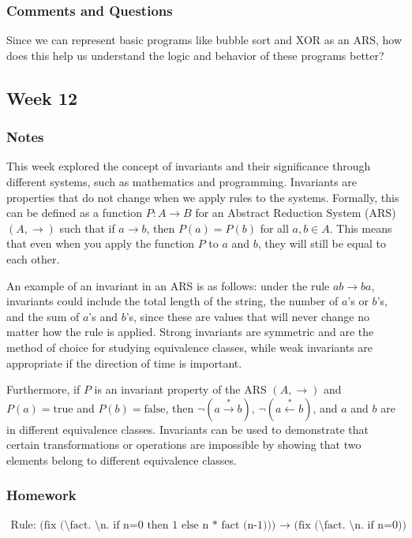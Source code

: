 \documentclass{article}
\theoremstyle{theorem}
\theoremstyle{definition}
\theoremstyle{remark}
\begin{document}
\subsubsection{Comments and Questions}

Since we can represent basic programs like bubble sort and XOR as an ARS, how does this help us understand the  logic and behavior of these programs better?

\subsection{Week 12}

\subsubsection{Notes}

This week explored the concept of invariants and their significance through different systems, such as mathematics and programming. Invariants are properties that do not change when we apply rules to the systems. Formally, this can be defined as a function $P: A \to B$ for an Abstract Reduction System (ARS) $(A, \to)$ such that if $a \to b$, then $P(a) = P(b)$ for all $a, b \in A$. This means that even when you apply the function $P$ to $a$ and $b$, they will still be equal to each other. 

An example of an invariant in an ARS is as follows: under the rule $ab \to ba$, invariants could include the total length of the string, the number of $a$'s or $b$'s, and the sum of $a$'s and $b$'s, since these are values that will never change no matter how the rule is applied. Strong invariants are symmetric and are the method of choice for studying equivalence classes, while weak invariants are appropriate if the direction of time is important.

Furthermore, if $P$ is an invariant property of the ARS $(A, \to)$ and $P(a) = \text{true}$ and $P(b) = \text{false}$, then $\neg (a \overset{*}{\to} b)$, $\neg (a \overset{*}{\leftarrow} b)$, and $a$ and $b$ are in different equivalence classes. Invariants can be used to demonstrate that certain transformations or operations are impossible by showing that two elements belong to different equivalence classes.


\subsubsection{Homework}
\begin{align*}
  \text{Rule: (fix (\textbackslash fact. \textbackslash n. if n=0 then 1 else n * fact (n-1))) $\rightarrow$ (fix (\textbackslash fact. \textbackslash n. if n=0))}
\end{align*}
\end{document}
